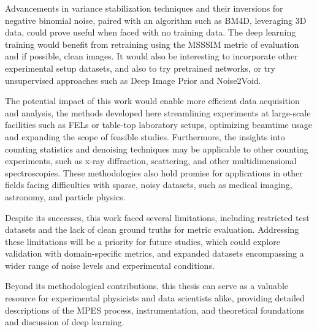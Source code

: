 Advancements in variance stabilization techniques and their inversions for negative binomial noise, paired with an algorithm such as BM4D, leveraging 3D data, could prove useful when faced with no training data. The deep learning training would benefit from retraining using the \gls{MSSSIM} metric of evaluation and if possible, clean images. It would also be interesting to incorporate other experimental setup datasets, and also to try pretrained networks, or try unsupervised approaches such as Deep Image Prior and Noise2Void.

The potential impact of this work would enable more efficient data acquisition and analysis, the methods developed here streamlining experiments at large-scale facilities such as \glspl{FEL} or table-top laboratory setups, optimizing beamtime usage and expanding the scope of feasible studies. Furthermore, the insights into counting statistics and denoising techniques may be applicable to other counting experiments, such as x-ray diffraction, scattering, and other multidimensional spectroscopies. These methodologies also hold promise for applications in other fields facing difficulties with sparse, noisy datasets, such as medical imaging, astronomy, and particle physics.

Despite its successes, this work faced several limitations, including restricted test datasets and the lack of clean ground truths for metric evaluation. Addressing these limitations will be a priority for future studies, which could explore validation with domain-specific metrics, and expanded datasets encompassing a wider range of noise levels and experimental conditions. 

Beyond its methodological contributions, this thesis can serve as a valuable resource for experimental physicists and data scientists alike, providing detailed descriptions of the \gls{MPES} process, instrumentation, and theoretical foundations and discussion of deep learning.



